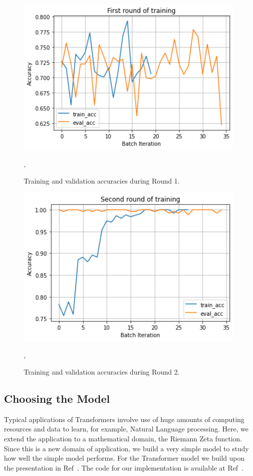 \documentclass[twoside]{article}
\begin{document}
\begin{figure}
\includegraphics[width=1.0\textwidth]{Round1.png}
\caption[]{ 
 Training and validation accuracies during Round 1.
 }
\vspace{1mm}, 
\label{fig:round1}
\end{figure}


\begin{figure}
\includegraphics[width=1.0\textwidth]{Round2.png}
\caption[]{ 
 Training and validation accuracies during Round 2.
 }
\vspace{1mm}, 
\label{fig:round2}
\end{figure}



\subsection{\label{sec3.1} Choosing the Model}
Typical applications of Transformers involve use of huge amounts of computing resources and data to learn, for example, Natural Language processing. Here, we extend the application to a mathematical domain, the Riemann Zeta function. Since this is a new domain of application, we build a very simple model to study how well the simple model performs. For the Transformer model we build upon the presentation in  Ref~\cite{BenjaminEtienne}. The code for our implementation is available at 
 Ref~\cite{shankergit}.
\end{document}
